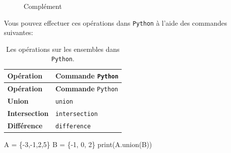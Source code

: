 \documentclass[
  letterpaper,
]{scrbook}
\newenvironment{Shaded}{}{}
\newcommand{\BuiltInTok}[1]{#1}
\newcommand{\DecValTok}[1]{\textcolor[rgb]{0.25,0.63,0.44}{#1}}
\newcommand{\NormalTok}[1]{#1}
\newcommand{\OperatorTok}[1]{\textcolor[rgb]{0.40,0.40,0.40}{#1}}
\theoremstyle{plain}
\theoremstyle{definition}
\theoremstyle{definition}
\theoremstyle{remark}
\begin{document}
\begin{figure}
\begin{minipage}[t]{0.50\linewidth}
{\centering 


\caption{Complément}

}

\end{minipage}%

\end{figure}

Vous pouvez effectuer ces opérations dans \texttt{Python} à l'aide des
commandes suivantes:

\hypertarget{tbl-operations-ensembles-python}{}
\begin{longtable}[]{@{}ll@{}}
\caption{\label{tbl-operations-ensembles-python}Les opérations sur les
ensembles dans \texttt{Python}.}\tabularnewline
\toprule()
\textbf{Opération} & \textbf{Commande} \texttt{Python} \\
\midrule()
\endfirsthead
\toprule()
\textbf{Opération} & \textbf{Commande} \texttt{Python} \\
\midrule()
\endhead
\textbf{Union} & \texttt{union} \\
\textbf{Intersection} & \texttt{intersection} \\
\textbf{Différence} & \texttt{difference} \\
\bottomrule()
\end{longtable}

\hypertarget{union-python}{}
\begin{Shaded}
\begin{Highlighting}[]
\NormalTok{A }\OperatorTok{=}\NormalTok{ \{}\OperatorTok{{-}}\DecValTok{3}\NormalTok{,}\OperatorTok{{-}}\DecValTok{1}\NormalTok{,}\DecValTok{2}\NormalTok{,}\DecValTok{5}\NormalTok{\}}
\NormalTok{B }\OperatorTok{=}\NormalTok{ \{}\OperatorTok{{-}}\DecValTok{1}\NormalTok{, }\DecValTok{0}\NormalTok{, }\DecValTok{2}\NormalTok{\}}
\BuiltInTok{print}\NormalTok{(A.union(B))}
\end{Highlighting}
\end{Shaded}
\end{document}
